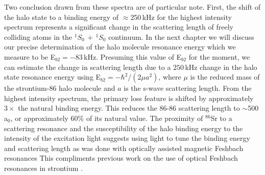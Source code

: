 Two conclusion drawn from these spectra are of particular note.
First, the shift of the halo state to a binding energy of $\approx$250\,kHz for the highest intensity spectrum represents a significant change in the scattering length of freely colliding atoms in the $^1S_0\,+\,^1S_0$ continuum.
In the next chapter we will discuss our precise determination of the halo molecule resonance energy which we measure to be E$_{b2}=-83$\,kHz.
Presuming this value of E$_{b2}$ for the moment, we can estimate the change in scattering length due to a $250$\,kHz change in the halo state resonance energy using E$_{b2}=-\hbar^2/(2 \mu a^2)$, where $\mu$ is the reduced mass of the strontium-86 halo molecule and $a$ is the s-wave scattering length.
From the highest intensity spectrum, the primary loss feature is shifted by approximately $3\times$ the natural binding energy.
This reduces the $86$-$86$ scattering length to $\sim$500\,a$_0$, or approximately $60$\% of its natural value.
The proximity of $^{86}$Sr to a scattering resonance and the susceptibility of the halo binding energy to the intensity of the excitation light suggests using light to tune the binding energy and scattering length as was done with optically assisted magnetic Feshbach resonances \cite{blv09,chx15}
This compliments previous work on the use of optical Feshbach resonances in strontium \cite{Fedichev1996a,Theis2004,Yamazaki2010,Blatt,Yan2013c}. 

